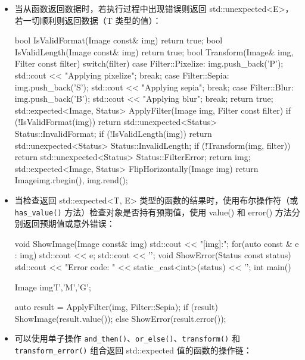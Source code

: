 \begin{itemize}
\item
当从函数返回数据时，若执行过程中出现错误则返回 std::unexpected<E>，若一切顺利则返回数据（T 类型的值）：

\begin{cpp}
bool IsValidFormat(Image const& img) { return true; }
bool IsValidLength(Image const& img) { return true; }
bool Transform(Image& img, Filter const filter)
{
    switch(filter)
    {
        case Filter::Pixelize:
            img.push_back('P');
            std::cout << "Applying pixelize\n";
        break;
        case Filter::Sepia:
            img.push_back('S');
            std::cout << "Applying sepia\n";
        break;
        case Filter::Blur:
            img.push_back('B');
            std::cout << "Applying blur\n";
        break;
    }
    return true;
}
std::expected<Image, Status> ApplyFilter(Image img,
                                         Filter const filter)
{
    if (!IsValidFormat(img))
        return std::unexpected<Status> {Status::InvalidFormat};
    if (!IsValidLength(img))
        return std::unexpected<Status> {Status::InvalidLength};
    if (!Transform(img, filter))
        return std::unexpected<Status> {Status::FilterError};
    return img;
}
std::expected<Image, Status> FlipHorizontally(Image img)
{
    return Image{img.rbegin(), img.rend()};
}
\end{cpp}

\item
当检查返回 std::expected<T, E> 类型的函数的结果时，使用布尔操作符（或 \verb|has_value()| 方法）检查对象是否持有预期值，使用 value() 和 error() 方法分别返回预期值或意外错误：

\begin{cpp}
void ShowImage(Image const& img)
{
    std::cout << "[img]:";
    for(auto const & e : img) std::cout << e;
    std::cout << '\n';
}
void ShowError(Status const status)
{
    std::cout << "Error code: "
              << static_cast<int>(status) << '\n';
}
int main()
{
    Image img{'I','M','G'};

    auto result = ApplyFilter(img, Filter::Sepia);
    if (result)
    {
        ShowImage(result.value());
    }
    else
    {
        ShowError(result.error());
    }
}
\end{cpp}

\item
可以使用单子操作 \verb|and_then()|、\verb|or_else()|、\verb|transform()| 和 \verb|transform_error()| 组合返回 std::expected 值的函数的操作链：


\end{itemize}
